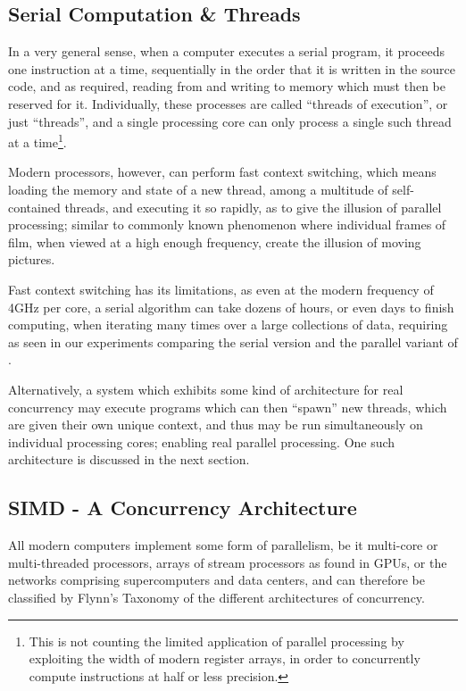 %
%
%
%
\subsection{Serial Computation \& Threads}
In a very general sense, when a computer executes a serial program, it proceeds one instruction at a time, sequentially in the order that it is written in the source code, and as required, reading from and writing to memory which must then be reserved for it. Individually, these processes are called ``threads of execution'', or just ``threads'', and a single processing core can only process a single such thread at a time\footnote{This is not counting the limited application of parallel processing by exploiting the width of modern register arrays, in order to concurrently compute instructions at half or less precision.}.

Modern processors, however, can perform fast context switching, which means loading the memory and state of a new thread, among a multitude of self-contained threads, and executing it so rapidly, as to give the illusion of parallel processing; similar to commonly known phenomenon where individual frames of film, when viewed at a high enough frequency, create the illusion of moving pictures.

Fast context switching has its limitations, as even at the modern frequency of 4GHz per core, a serial algorithm can take dozens of hours, or even days to finish computing, when iterating many times over a large collections of data, requiring as seen in our experiments comparing the serial version and the parallel variant of .

Alternatively, a system which exhibits some kind of architecture for real concurrency may execute programs which can then ``spawn'' new threads, which are given their own unique context, and thus may be run simultaneously on individual processing cores; enabling real parallel processing. One such architecture is discussed in the next section.

%
%
%
%
\subsection{SIMD - A Concurrency Architecture}
All modern computers implement some form of parallelism, be it multi-core or multi-threaded processors, arrays of stream processors as found in GPUs, or the networks comprising supercomputers and data centers, and can therefore be classified by Flynn's Taxonomy of the different architectures of concurrency.

